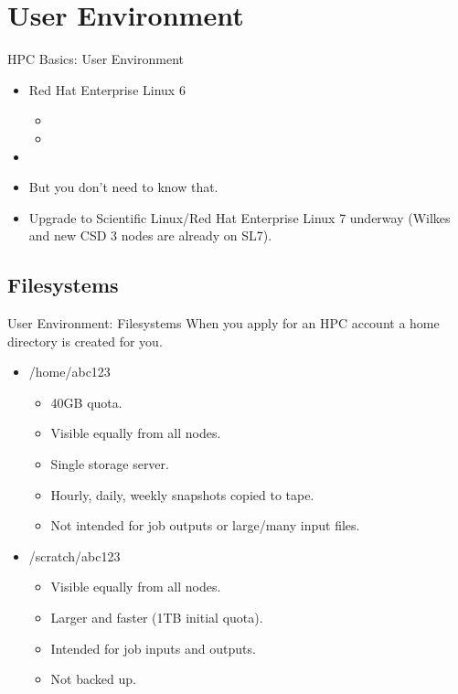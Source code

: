 \section{User Environment}
\begin{frame}{HPC Basics: User Environment}
\begin{itemize}
\item<1,4>{\alert<1>{{Red Hat Enterprise Linux 6}}}
\begin{itemize}
\item{}
\item{}
\end{itemize}
\item<1,4>{}
\item<2->{But you don't need to know that. }
\item<5->{Upgrade to Scientific Linux/Red Hat Enterprise Linux 7 underway (Wilkes and new CSD 3 nodes are already on SL7).}
\end{itemize}
\end{frame}

\subsection{Filesystems}
\begin{frame}{User Environment: Filesystems}
When you apply for an HPC account a home directory is created for you. 
\begin{itemize}
\item{\alert{/home/abc123}}
\begin{itemize}
\item{40GB quota.}
\item{Visible equally from all nodes.}
\item{Single storage server.}
\item{Hourly, daily, weekly snapshots copied to tape.}
\item{Not intended for job outputs or large/many input files.}
\end{itemize}
\item{\alert{/scratch/abc123}}
\begin{itemize}
\item{Visible equally from all nodes.}
\item{Larger and faster (1TB initial quota).}
\item{Intended for job inputs and outputs.}
\item{{\color{red}Not backed up.}}
 \pause
\end{itemize}
\end{itemize}
\end{frame}

